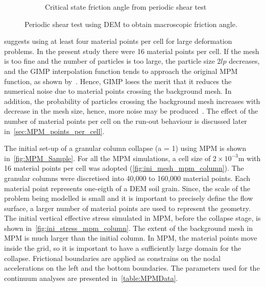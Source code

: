 \begin{figure}
\begin{subfigure}[b]{0.65\textwidth}
\caption{Critical state friction angle from periodic shear test}
\label{fig:Sxy_vs_Syy}
\end{subfigure} 
\caption{Periodic shear test using DEM to obtain macroscopic friction angle.}
\label{fig:shear_test}
\end{figure}

\citet{Guilkey2003} suggests using at least four material points per cell for 
large deformation problems. In the present study there were 16 material points 
per cell. If the mesh is too fine and the number of particles is too 
large, the particle size $2lp$ decreases, and the GIMP interpolation 
function tends to approach the original MPM function, as shown 
by~\citet{Bardenhagen2004}. Hence, GIMP loses the merit that it reduces the 
numerical noise due to material points crossing the background mesh. In 
addition, the probability of particles crossing the background mesh increases 
with decrease in the mesh size, hence, more noise may be 
produced~\citep{Abe2013}. The effect of the number of material points per cell 
on the run-out behaviour is discussed later in~\cref{sec:MPM_points_per_cell}.

The initial set-up of a granular column collapse (a = 1) using MPM is shown 
in~\cref{fig:MPM_Sample}. For all the MPM simulations, a cell size of 
$2\times10^{-3}\si{\m}$ with 16 material points per cell was adopted 
(\cref{fig:ini_mesh_mpm_column}). The granular columns were
discretised into 40,000 to 160,000 material points. Each material point 
represents one-eigth of a DEM soil grain. Since, the scale of the problem being 
modelled is small and it is important to precisely define the flow surface, a 
larger number of material points are used to represent the geometry. The 
initial vertical effective stress simulated in MPM, before the collapse stage, 
is shown in~\cref{fig:ini_stress_mpm_column}. The extent of the 
background mesh in MPM is much larger than the initial column. In MPM, the 
material points move inside the grid, so it is important to have a sufficiently 
large domain for the collapse. Frictional boundaries are applied as constrains 
on the nodal accelerations on the left and the bottom boundaries. The 
parameters used for the continuum analyses are presented 
in~\cref{table:MPMData}. 


